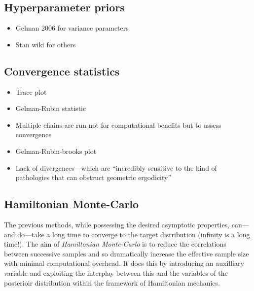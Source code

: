 \documentclass{article}
\begin{document}
\subsection{Hyperparameter priors}

\begin{itemize}

\item Gelman 2006 for variance parameters

\item Stan wiki for others

\end{itemize}

\subsection{Convergence statistics}

\begin{itemize}

\item Trace plot

\item Gelman-Rubin statistic

\item Multiple-chains are run not for computational benefits but to assess convergence

\item Gelman-Rubin-brooks plot

\item Lack of divergences---which are ``incredibly sensitive to the kind of pathologies that can obstruct geometric ergodicity'' 


\end{itemize}


\subsection{Hamiltonian Monte-Carlo}

The previous methods, while possessing the desired asymptotic properties, can---and do---take a long time to converge to the target distribution (infinity is a long time!). The aim of \emph{Hamiltonian Monte-Carlo} is to reduce the correlations between successive samples and so dramatically increase the effective sample size with minimal computational overhead. It does this by introducing an auxilliary variable and exploiting the interplay between this and the variables of the posterioir distribution within the framework of Hamiltonian mechanics.
\end{document}
